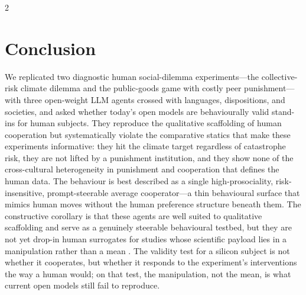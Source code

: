 \documentclass[openacc]{rsproca_new}%
\begin{document}
\begin{multicols}{2}
\section{Conclusion}

We replicated two diagnostic human social-dilemma experiments---the collective-risk climate dilemma and the public-goods game with costly peer punishment---with three open-weight LLM agents crossed with languages, dispositions, and societies, and asked whether today's open models are behaviourally valid stand-ins for human subjects. They reproduce the qualitative scaffolding of human cooperation but systematically violate the comparative statics that make these experiments informative: they hit the climate target regardless of catastrophe risk, they are not lifted by a punishment institution, and they show none of the cross-cultural heterogeneity in punishment and cooperation that defines the human data. The behaviour is best described as a single high-prosociality, risk-insensitive, prompt-steerable average cooperator---a thin behavioural surface that mimics human moves without the human preference structure beneath them. The constructive corollary is that these agents are well suited to qualitative scaffolding and serve as a genuinely steerable behavioural testbed, but they are not yet drop-in human surrogates for studies whose scientific payload lies in a manipulation rather than a mean \cite{horton2023llm, fairgame2025}. The validity test for a silicon subject is not whether it cooperates, but whether it responds to the experiment's interventions the way a human would; on that test, the manipulation, not the mean, is what current open models still fail to reproduce.

\end{multicols}

\enlargethispage{20pt}


\end{document}
